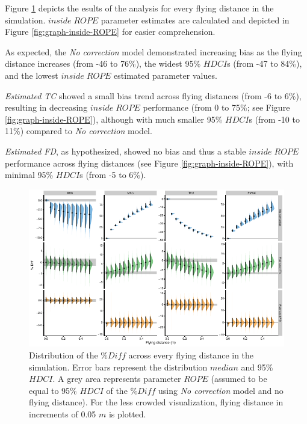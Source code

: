\documentclass[fleqn,10pt]{wlpeerj} %
\begin{document}
Figure \ref{fig:graph-per-FD} depicts the esults of the analysis for every flying distance in the simulation. \(inside \; ROPE\) parameter estimates are calculated and depicted in Figure \ref{fig:graph-inside-ROPE} for easier comprehension.

As expected, the \emph{No correction} model demonstrated increasing bias as the flying distance increases (from -46 to 76\%), the widest 95\% \(HDCI\)s (from -47 to 84\%), and the lowest \(inside \; ROPE\) estimated parameter values.

\emph{Estimated TC} showed a small bias trend across flying distances (from -6 to 6\%), resulting in decreasing \(inside \; ROPE\) performance (from 0 to 75\%; see Figure \ref{fig:graph-inside-ROPE}), although with much smaller 95\% \(HDCI\)s (from -10 to 11\%) compared to \emph{No correction} model.

\emph{Estimated FD}, as hypothesized, showed no bias and thus a stable \(inside \; ROPE\) performance across flying distances (see Figure \ref{fig:graph-inside-ROPE}), with minimal 95\% \(HDCI\)s (from -5 to 6\%).



\begin{figure}

{\centering \includegraphics[width=0.9\linewidth]{shorts-simulation-paper_files/figure-latex/graph-per-FD-1} 

}

\caption{Distribution of the \(\%Diff\) across every flying distance in the simulation. Error bars represent the distribution \(median\) and 95\% \(HDCI\). A grey area represents parameter \(ROPE\) (assumed to be equal to 95\% \(HDCI\) of the \(\%Diff\) using \emph{No correction} model and no flying distance). For the less crowded visualization, flying distance in increments of 0.05 \(m\) is plotted.}\label{fig:graph-per-FD}
\end{figure}
\end{document}
